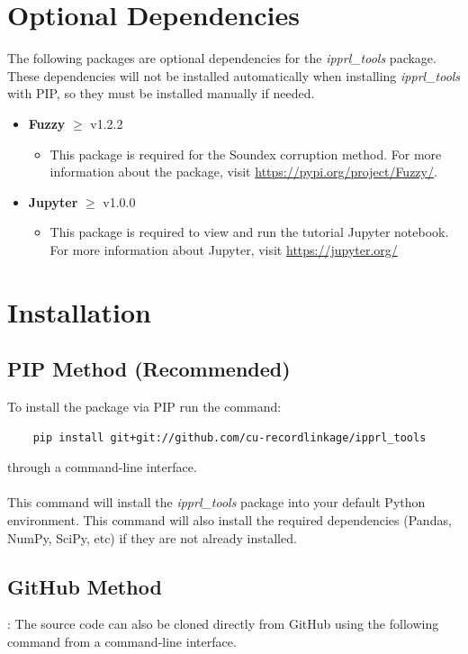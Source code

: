 \documentclass[titlepage, 11pt]{article}
\newcommand{\pkgname}{\textit{ipprl\_tools}}
\begin{document}
\section{Optional Dependencies}
The following packages are optional dependencies for the \pkgname{} package. These dependencies will not be installed automatically when installing \pkgname{} with PIP, so they must be installed manually if needed.

\begin{itemize}
    \item \textbf{Fuzzy} $\geq$ v1.2.2
    \begin{itemize}
        \item This package is required for the Soundex corruption method. For more information about the package, visit \url{https://pypi.org/project/Fuzzy/}.
    \end{itemize}
    \item \textbf{Jupyter} $\geq$ v1.0.0
    \begin{itemize}
        \item This package is required to view and run the tutorial Jupyter notebook. For more information about Jupyter, visit \url{https://jupyter.org/}
    \end{itemize}
\end{itemize}

\section{Installation}

\subsection{PIP Method (Recommended)}
To install the package via PIP run the command:
\begin{verbatim}
    pip install git+git://github.com/cu-recordlinkage/ipprl_tools
\end{verbatim}
through a command-line interface.
\\
\\
\noindent This command will install the \pkgname{} package into your default Python environment. This command will also install the required dependencies (Pandas, NumPy, SciPy, etc) if they are not already installed. 

\subsection{GitHub Method}: 
The source code can also be cloned directly from GitHub using the following command from a command-line interface.
\end{document}
